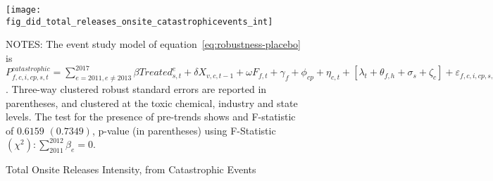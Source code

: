 \begin{figure}[H]
    \centering
    \texttt{[image: fig\_did\_total\_releases\_onsite\_catastrophicevents\_int]}
    \caption{Total Onsite Releases Intensity, from Catastrophic Events}
    \label{fig:baseline-placebo}
    \begin{minipage}{12cm}
        \vspace{0.05in}
        NOTES: The event study model of equation~\ref{eq:robustness-placebo} is $P_{f,c,i,cp,s,t}^{catastrophic} = \sum_{{e = 2011},{e \neq 2013}}^{2017} \beta Treated_{s,t}^e + \delta X_{v,c,t-1} + \omega F_{f,t} + \gamma_{f} + \phi_{cp} + \eta_{c,t} + \left[\lambda_{t} + \theta_{f,h} + \sigma_{s} + \zeta_{c} \right] + \varepsilon_{f,c,i,cp,s,t}$. Three-way clustered robust standard errors are reported in parentheses, and clustered at the toxic chemical, industry and state levels. The test for the presence of pre-trends shows and F-statistic of $0.6159$ $(0.7349)$, p-value (in parentheses) using F-Statistic $(\chi^2): \sum_{2011}^{2012} \beta_{e} = 0$.
    \end{minipage}
\end{figure}